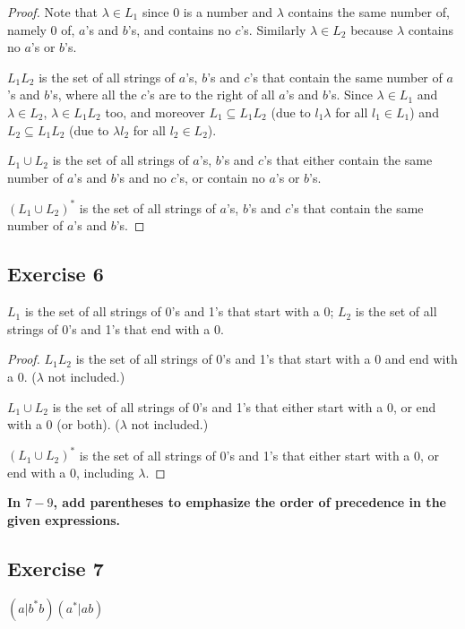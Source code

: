 \documentclass[14pt]{extarticle}
\newcommand{\cy}{\color{cyan}}
\begin{document}
\begin{proof}
Note that \(\lambda \in L_1\) since 0 is a number and \(\lambda\) contains the same number of, namely 0 of, \(a\)'s
and \(b\)'s, and contains no \(c\)'s. Similarly \(\lambda \in L_2\) because \(\lambda\) contains no \(a\)'s or \(b\)'s.

\(L_1L_2\) is the set of all strings of \(a\)’s, \(b\)’s and \(c\)’s that contain the same number of \(a\)’s and \(b\)’s,
where all the \(c\)'s are to the right of all \(a\)’s and \(b\)’s. Since \(\lambda \in L_1\) and \(\lambda \in L_2\),
\(\lambda \in L_1L_2\) too, and moreover \(L_1 \subseteq L_1L_2\) (due to \(l_1 \lambda\) for all \(l_1 \in L_1\)) and 
\(L_2 \subseteq L_1L_2\) (due to \(\lambda l_2\) for all \(l_2 \in L_2\)).

\(L_1 \cup L_2\) is the set of all strings of \(a\)’s, \(b\)’s and \(c\)’s that either contain the same number of \(a\)’s and 
\(b\)’s and no \(c\)'s, or contain no \(a\)'s or \(b\)'s. 

\((L_1 \cup L_2)^*\) is the set of all strings of \(a\)’s, \(b\)’s and \(c\)’s that contain the same number of \(a\)’s and 
\(b\)’s.
\end{proof}

\subsection{Exercise 6}
\(L_1\) is the set of all strings of 0’s and 1’s that start with a 0; \(L_2\) is the set of all strings of 0’s and 1’s 
that end with a 0.

\begin{proof}
\(L_1L_2\) is the set of all strings of 0’s and 1’s that start with a 0 and end with a 0. (\(\lambda\) not included.)

\(L_1 \cup L_2\) is the set of all strings of 0’s and 1’s that either start with a 0, or end with a 0 (or both). 
(\(\lambda\) not included.)

\((L_1 \cup L_2)^*\) is the set of all strings of 0’s and 1’s that either start with a 0, or end with a 0, including
\(\lambda\).
\end{proof}

{\bf \cy In \(7-9\), add parentheses to emphasize the order of precedence in the given expressions.}

\subsection{Exercise 7}
\((a | b^*b)(a^* | ab)\)
\end{document}

